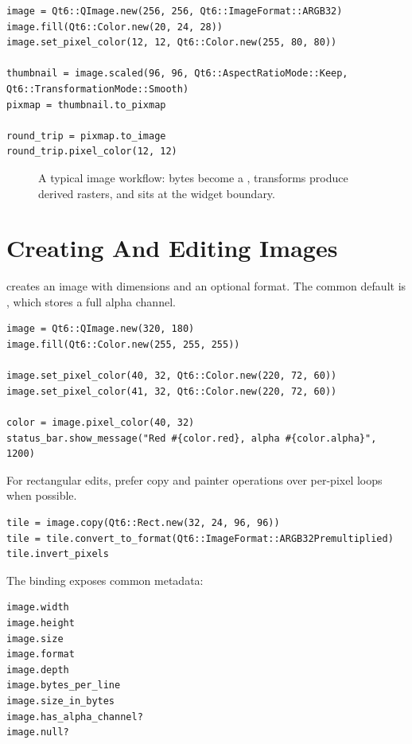 \begin{lstlisting}[style=crystal]
image = Qt6::QImage.new(256, 256, Qt6::ImageFormat::ARGB32)
image.fill(Qt6::Color.new(20, 24, 28))
image.set_pixel_color(12, 12, Qt6::Color.new(255, 80, 80))

thumbnail = image.scaled(96, 96, Qt6::AspectRatioMode::Keep, Qt6::TransformationMode::Smooth)
pixmap = thumbnail.to_pixmap

round_trip = pixmap.to_image
round_trip.pixel_color(12, 12)
\end{lstlisting}

\begin{figure}[htbp]
  \centering
  \caption{A typical image workflow: bytes become a , transforms produce derived rasters, and  sits at the widget boundary.}
\end{figure}

\section{Creating And Editing Images}

 creates an image with dimensions and an optional format. The common default is , which stores a full alpha channel.

\begin{lstlisting}[style=crystal]
image = Qt6::QImage.new(320, 180)
image.fill(Qt6::Color.new(255, 255, 255))

image.set_pixel_color(40, 32, Qt6::Color.new(220, 72, 60))
image.set_pixel_color(41, 32, Qt6::Color.new(220, 72, 60))

color = image.pixel_color(40, 32)
status_bar.show_message("Red #{color.red}, alpha #{color.alpha}", 1200)
\end{lstlisting}

For rectangular edits, prefer copy and painter operations over per-pixel loops when possible.

\begin{lstlisting}[style=crystal]
tile = image.copy(Qt6::Rect.new(32, 24, 96, 96))
tile = tile.convert_to_format(Qt6::ImageFormat::ARGB32Premultiplied)
tile.invert_pixels
\end{lstlisting}

The binding exposes common metadata:

\begin{lstlisting}[style=crystal]
image.width
image.height
image.size
image.format
image.depth
image.bytes_per_line
image.size_in_bytes
image.has_alpha_channel?
image.null?
\end{lstlisting}

